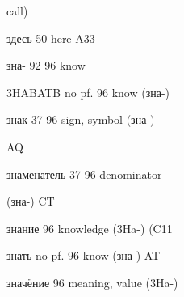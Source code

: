 \begin{minipage}[t]{0.475\textwidth}
\noindent call)\par
\noindent здесь 50 here A33\par
\noindent зна- 92 96 know\par
\noindent 3HABATB no pf. 96 know (зна-)\par
\noindent знак 37 96 sign, symbol (зна-)\par
\noindent AQ\par
\noindent знаменатель 37 96 denominator\par
\noindent (зна-) CT\par
\noindent знание 96 knowledge (3Ha-) (C11\par
\noindent знать no pf. 96 know (зна-) AT\par
\noindent значёние 96 meaning, value (3Ha-)\par
\end{minipage}
\endgroup

